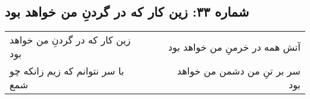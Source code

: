 \begin{center}
\section*{شماره ۳۳: زین کار که در گردنِ من خواهد بود}
\label{sec:033}
\begin{longtable}{l p{0.5cm} r}
زین کار که در گردنِ من خواهد بود
&&
آتش همه در خرمنِ من خواهد بود
\\
با سر نتوانم که زیم زانکه چو شمع
&&
سر بر تنِ من دشمن من خواهد بود
\\
\end{longtable}
\end{center}
